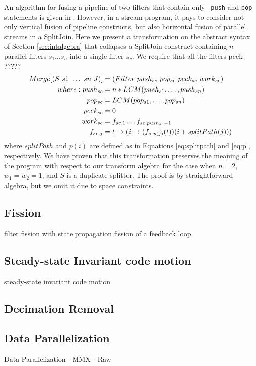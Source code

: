 An algorithm for fusing a pipeline of two filters that contain only {\tt
push} and {\tt pop} statements is given in \cite{pro96}.  However, in a
stream program, it pays to consider not only vertical fusion of pipeline
constructs, but also horizontal fusion of parallel streams in a
SplitJoin.  Here we present a transformation on the abstract syntax of
Section \ref{sec:intalgebra} that collapses a SplitJoin construct
containing $n$ parallel filters $s_1 \dots s_n$ into a single filter
$s_c$.  We require that all the filters peek ?????
\begin{align*}
Merge[(S~s1~\dots~sn~J)] &= (Filter~push_{sc}~pop_{sc}~peek_{sc}~work_{sc}) \\
where: push_{sc} &= n*LCM(push_{s1}, \dots, push_{sn}) \\
       pop_{sc} &= LCM(pop_{s1}, \dots, pop_{sn}) \\
       peek_{sc} &= 0\\
       work_{sc} &= f_{sc, 1} \dots f_{sc, push_{sc} - 1} \\
       f_{sc, j} &= t \rightarrow (i \rightarrow (f_{s~p(j)}(t))(i + splitPath(j)))
\end{align*}
where $splitPath$ and $p(i)$ are defined as in Equations
\ref{eq:splitpath} and \ref{eq:p}, respectively.  We have proven that
this transformation preserves the meaning of the program with respect to
our transform algebra for the case when $n = 2$, $w_1 = w_2 = 1$, and
$S$ is a duplicate splitter.  The proof is by straightforward algebra,
but we omit it due to space constraints.

\subsection{Fission}

filter fission with state propagation
fission of a feedback loop

\subsection{Steady-state Invariant code motion}

steady-state invariant code motion

\subsection{Decimation Removal}

\subsection{Data Parallelization}

Data Parallelization
-	MMX
-	Raw


